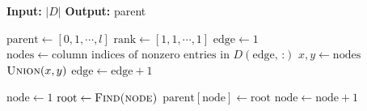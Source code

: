 \begin{algorithm}[H]
\caption{\textsc{DSU}}
\label{alg:dsu}
\begin{algorithmic}[1]
\State \textbf{Input:} $|D|$ 
\State \textbf{Output:} parent

\State $\text{parent} \gets [0, 1, \cdots, l]$ 
\State $\text{rank} \gets [1, 1, \cdots, 1]$ 
\State $\text{edge}\gets 1$
\State $\text{nodes} \gets \text{column indices of nonzero entries in } D(\text{edge, :})$
\State $x, y \gets \text{nodes}$
\State $\textsc{Union}(x, y)$
\EndIf  
\State $\text{edge} \gets \text{edge}+1$
\EndWhile


\State $\text{node}\gets 1$
\State $\text{root}\gets \textsc{Find(node)}$
\State $\text{parent}[\text{node}]\gets \text{root}$
\EndIf
\State $\text{node}\gets \text{node} + 1$
\EndWhile

\end{algorithmic}
\end{algorithm}
